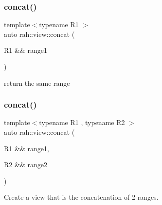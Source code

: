 \subsubsection{\texorpdfstring{concat()}{concat()}\hspace{0.1cm}{\footnotesize\ttfamily [1/3]}}
{\footnotesize\ttfamily template$<$typename R1 $>$ \\
auto rah\+::view\+::concat (\begin{DoxyParamCaption}\item[{R1 \&\&}]{range1 }\end{DoxyParamCaption})}



return the same range 

\mbox{\label{namespacerah_1_1view_a114597b820b9ca8f3c286f026f818399}} 
\subsubsection{\texorpdfstring{concat()}{concat()}\hspace{0.1cm}{\footnotesize\ttfamily [2/3]}}
{\footnotesize\ttfamily template$<$typename R1 , typename R2 $>$ \\
auto rah\+::view\+::concat (\begin{DoxyParamCaption}\item[{R1 \&\&}]{range1,  }\item[{R2 \&\&}]{range2 }\end{DoxyParamCaption})}



Create a view that is the concatenation of 2 ranges. 


